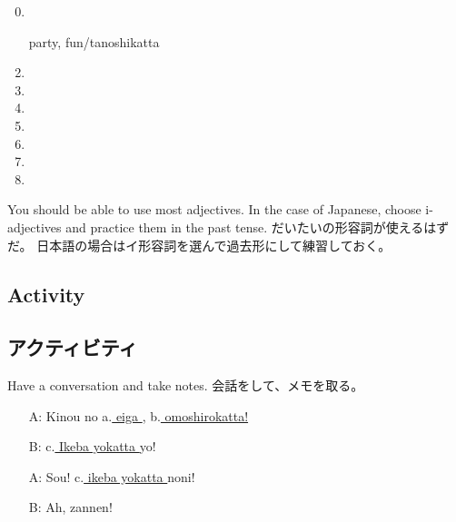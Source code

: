 \documentclass[uplatex,dvipdfmx,b5paper,english,10pt]{jsbook}
\begin{document}
\begin{multicols}{2}
\begin{enumerate}
 \setcounter{enumi}{-1}
 \item \hrulefill
 \vspace{-1.1\baselineskip}
 \item[]  party, fun/tanoshikatta
 \item \hrulefill
 \item \hrulefill
 \item \hrulefill
 \item \hrulefill
 \item \hrulefill
 \item \hrulefill
 \item \hrulefill
\end{enumerate}
\end{multicols}

\begin{toianswer}
\ifEnglish
You should be able to use most adjectives.
In the case of Japanese, choose i-adjectives and practice them in the past tense.
\else
だいたいの形容詞が使えるはずだ。
日本語の場合はイ形容詞を選んで過去形にして練習しておく。
\fi
\end{toianswer}

\ifEnglish
\subsection{Activity}
\else
\subsection{アクティビティ}
\fi

\begin{toiquestion}
\ifEnglish
Have a conversation and take notes.
\else
会話をして、メモを取る。
\fi
\end{toiquestion}

\begin{itemize}
 \item[A:] Kinou no a.\underline{ eiga }, b.\underline{ omoshirokatta! }
 \item[B:] c.\underline{ Ikeba yokatta } yo!
 \item[A:] Sou! c.\underline{ ikeba yokatta } noni!
 \item[B:] Ah, zannen!
\end{itemize}
\end{document}
